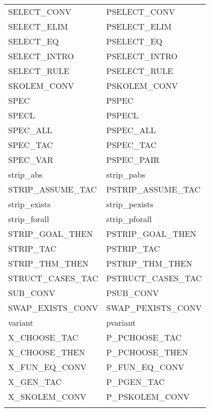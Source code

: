 {\begin{center}
\begin{tabular}[t]{|l|l|}
        SELECT\_CONV                &   PSELECT\_CONV               \\
        SELECT\_ELIM                &   PSELECT\_ELIM               \\
        SELECT\_EQ                  &   PSELECT\_EQ                 \\
        SELECT\_INTRO               &   PSELECT\_INTRO              \\
        SELECT\_RULE                &   PSELECT\_RULE               \\
        SKOLEM\_CONV                &   PSKOLEM\_CONV               \\
        SPEC                        &   PSPEC                       \\
        SPECL                       &   PSPECL                      \\
        SPEC\_ALL                   &   PSPEC\_ALL                  \\
        SPEC\_TAC                   &   PSPEC\_TAC                  \\
        SPEC\_VAR                   &   PSPEC\_PAIR                 \\
        strip\_abs                  &   strip\_pabs                 \\
        STRIP\_ASSUME\_TAC          &   PSTRIP\_ASSUME\_TAC         \\
        strip\_exists               &   strip\_pexists              \\
        strip\_forall               &   strip\_pforall              \\
        STRIP\_GOAL\_THEN           &   PSTRIP\_GOAL\_THEN          \\
        STRIP\_TAC                  &   PSTRIP\_TAC                 \\
        STRIP\_THM\_THEN            &   PSTRIP\_THM\_THEN           \\
        STRUCT\_CASES\_TAC          &   PSTRUCT\_CASES\_TAC         \\
        SUB\_CONV                   &   PSUB\_CONV                  \\
        SWAP\_EXISTS\_CONV          &   SWAP\_PEXISTS\_CONV         \\
        variant                     &   pvariant                    \\
        X\_CHOOSE\_TAC              &   P\_PCHOOSE\_TAC             \\
        X\_CHOOSE\_THEN             &   P\_PCHOOSE\_THEN            \\
        X\_FUN\_EQ\_CONV            &   P\_FUN\_EQ\_CONV            \\
        X\_GEN\_TAC                 &   P\_PGEN\_TAC                \\
        X\_SKOLEM\_CONV             &   P\_PSKOLEM\_CONV            \\
                                    &                               \\  \hline
    \end{tabular}
\end{center} }
